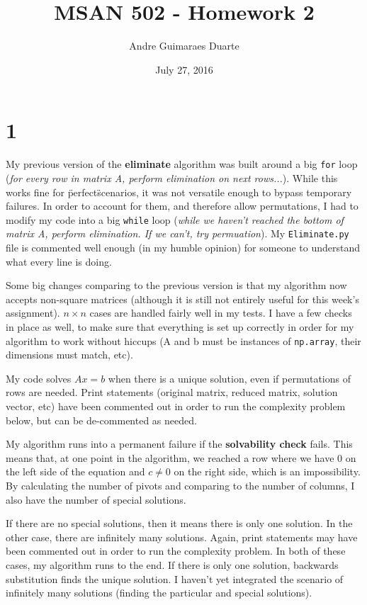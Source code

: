\documentclass[]{article}
\title{MSAN 502 - Homework 2}
\author{Andre Guimaraes Duarte}
\date{July 27, 2016}
\begin{document}
\maketitle

\section*{1}
My previous version of the \textbf{eliminate} algorithm was built around a big \texttt{for} loop (\textit{for every row in matrix A, perform elimination on next rows...}). While this works fine for \"perfect\" scenarios, it was not versatile enough to bypass temporary failures. In order to account for them, and therefore allow permutations, I had to modify my code into a big \texttt{while} loop (\textit{while we haven't reached the bottom of matrix A, perform elimination. If we can't, try permuation}). My \texttt{Eliminate.py} file is commented well enough (in my humble opinion) for someone to understand what every line is doing.

Some big changes comparing to the previous version is that my algorithm now accepts non-square matrices (although it is still not entirely useful for this week's assignment). $n \times n$ cases are handled fairly well in my tests. I have a few checks in place as well, to make sure that everything is set up correctly in order for my algorithm to work without hiccups (A and b must be instances of \texttt{np.array}, their dimensions must match, etc).

My code solves $Ax = b$ when there is a unique solution, even if permutations of rows are needed. Print statements (original matrix, reduced matrix, solution vector, etc) have been commented out in order to run the complexity problem below, but can be de-commented as needed.

My algorithm runs into a permanent failure if the \textbf{solvability check} fails. This means that, at one point in the algorithm, we reached a row where we have $0$ on the left side of the equation and $c \neq 0$ on the right side, which is an impossibility. By calculating the number of pivots and comparing to the number of columns, I also have the number of special solutions.

If there are no special solutions, then it means there is only one solution. In the other case, there are infinitely many solutions. Again, print statements may have been commented out in order to run the complexity problem. In both of these cases, my algorithm runs to the end. If there is only one solution, backwards substitution finds the unique solution. I haven't yet integrated the scenario of infinitely many solutions (finding the particular and special solutions).
\end{document}
